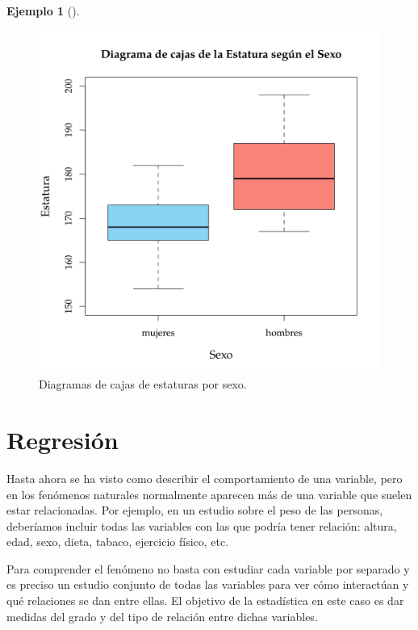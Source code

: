 \documentclass[
  a4paper,
]{scrreport}
\theoremstyle{plain}
\theoremstyle{definition}
\theoremstyle{definition}
\newtheorem{example}{Ejemplo}[chapter]
\theoremstyle{remark}
\begin{document}
\begin{example}[]
\begin{figure}[H]
{\centering \includegraphics{img/descriptiva/diagrama_caja_estatura_sexo.png}

}

\caption{Diagramas de cajas de estaturas por sexo.}

\end{figure}%

\end{example}


\chapter{Regresión}\label{regresiuxf3n}

Hasta ahora se ha visto como describir el comportamiento de una
variable, pero en los fenómenos naturales normalmente aparecen más de
una variable que suelen estar relacionadas. Por ejemplo, en un estudio
sobre el peso de las personas, deberíamos incluir todas las variables
con las que podría tener relación: altura, edad, sexo, dieta, tabaco,
ejercicio físico, etc.

Para comprender el fenómeno no basta con estudiar cada variable por
separado y es preciso un estudio conjunto de todas las variables para
ver cómo interactúan y qué relaciones se dan entre ellas. El objetivo de
la estadística en este caso es dar medidas del grado y del tipo de
relación entre dichas variables.
\end{document}
